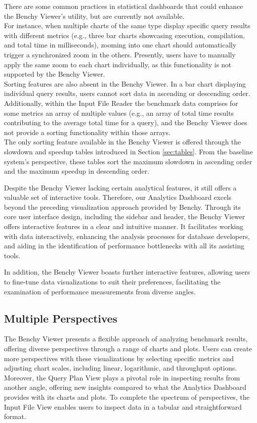 There are some common practices in statistical dashboards that could enhance the Benchy Viewer's utility, but are currently not available.\\
For instance, when multiple charts of the same type display specific query results with different metrics (e.g., three bar charts showcasing execution, compilation, and total time in milliseconds), zooming into one chart should automatically trigger a synchronized zoom in the others. Presently, users have to manually apply the same zoom to each chart individually, as this functionality is not supported by the Benchy Viewer.\\
Sorting features are also absent in the Benchy Viewer. In a bar chart displaying individual query results, users cannot sort data in ascending or descending order. Additionally, within the Input File Reader the benchmark data comprises for some metrics an array of multiple values (e.g., an array of total time results contributing to the average total time for a query), and the Benchy Viewer does not provide a sorting functionality within those arrays.\\
The only sorting feature available in the Benchy Viewer is offered through the slowdown and speedup tables introduced in Section \ref{sec:tables}. 
From the baseline system's perspective, these tables sort the maximum slowdown in ascending order and the maximum speedup in descending order.

Despite the Benchy Viewer lacking certain analytical features, it still offers a valuable set of interactive tools.
Therefore, our Analytics Dashboard excels beyond the preceding visualization approach provided by Benchy. Through its core user interface design, including the sidebar and header, the Benchy Viewer offers interactive features in a clear and intuitive manner. It facilitates working with data interactively, enhancing the analysis processes for database developers, and aiding in the identification of  performance bottlenecks with all its assisting tools. 

In addition, the Benchy Viewer boasts further interactive features, allowing users to fine-tune data visualizations to suit their preferences, facilitating the examination of performance measurements from diverse angles.


\subsection{Multiple Perspectives}

The Benchy Viewer presents a flexible approach of analyzing benchmark results, offering diverse perspectives through a range of charts and plots. Users can create more perspectives with these visualizations by selecting specific metrics and adjusting chart scales, including linear, logarithmic, and throughput options.
Moreover, the Query Plan View plays a pivotal role in inspecting results from another angle, offering new insights compared to what the Analytics Dashboard provides with its charts and plots. To complete the spectrum of perspectives, the Input File View enables users to inspect data in a tabular and straightforward format.

